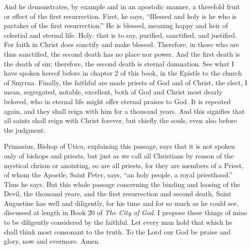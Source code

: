 And he demonstrates, by example and in an apostolic manner, a threefold fruit or effect of the first resurrection. First, he says, “Blessed and holy is he who is partaker of the first resurrection.” He is blessed, meaning happy and heir of celestial and eternal life. Holy: that is to say, purified, sanctified, and justified. For faith in Christ does sanctify and make blessed. Therefore, in those who are thus sanctified, the second death has no place nor power. And the first death is the death of sin; therefore, the second death is eternal damnation. See what I have spoken hereof before in chapter 2 of this book, in the Epistle to the church of Smyrna. Finally, the faithful are made priests of God and of Christ, the elect, I mean, segregated, notable, excellent, both of God and Christ most dearly beloved, who in eternal life might offer eternal praises to God. It is repeated again, and they shall reign with him for a thousand years. And this signifies that all saints shall reign with Christ forever, but chiefly the souls, even also before the judgment.

Primasius, Bishop of Utica, explaining this passage, says that it is not spoken only of bishops and priests, but just as we call all Christians by reason of the mystical chrism or anointing, so are all priests, for they are members of a Priest, of whom the Apostle, Saint Peter, says, “an holy people, a royal priesthood.” Thus he says. But this whole passage concerning the binding and loosing of the Devil, the thousand years, and the first resurrection and second death, Saint Augustine has well and diligently, for his time and for so much as he could see, discussed at length in Book 20 of \textit{The City of God}. I propose these things of mine to be diligently considered by the faithful. Let every man hold that which he shall think most consonant to the truth. To the Lord our God be praise and glory, now and evermore. Amen.
